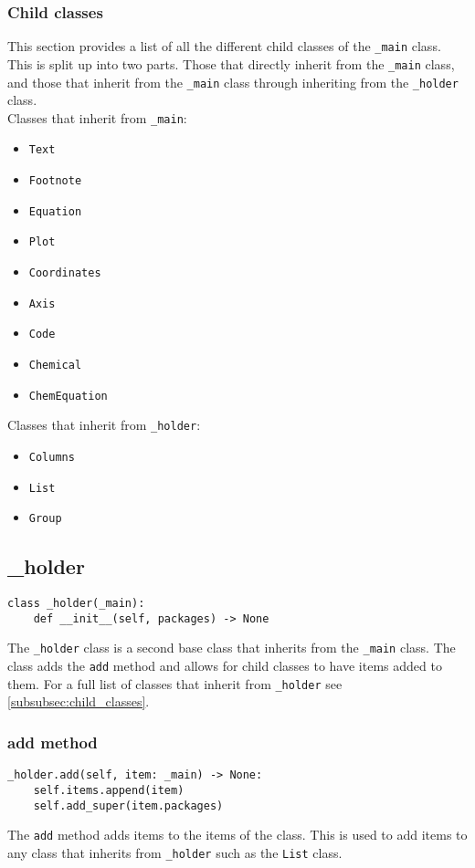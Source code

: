\documentclass{article}
\begin{document}
\subsubsection{Child classes}\label{subsubsec:child_classes}
This section provides a list of all the different child classes of the \verb|_main| class. This is split up into two parts. Those that directly inherit from the \verb|_main| class, and those that inherit from the \verb|_main| class through inheriting from the \verb|_holder| class.\\
Classes that inherit from \verb|_main|:\begin{multicols}{2}\begin{itemize}
\item \verb|Text|
\item \verb|Footnote|
\item \verb|Equation|
\item \verb|Plot|
\item \verb|Coordinates|
\item \verb|Axis|
\item \verb|Code|
\item \verb|Chemical|
\item \verb|ChemEquation|
\end{itemize}
\end{multicols}Classes that inherit from \verb|_holder|:\begin{multicols}{2}\begin{itemize}
\item \verb|Columns|
\item \verb|List|
\item \verb|Group|
\end{itemize}
\end{multicols}
\subsection{\_holder}\label{subsec:_holder}
\begin{verbatim}
class _holder(_main):
	def __init__(self, packages) -> None
\end{verbatim}
The \verb|_holder| class is a second base class that inherits from the \verb|_main| class. The class adds the \verb|add| method and allows for child classes to have items added to them. For a full list of classes that inherit from \verb|_holder| see \autoref{subsubsec:child_classes}.
\subsubsection{add method}\label{subsubsec:add_method001}
\begin{verbatim}
_holder.add(self, item: _main) -> None:
	self.items.append(item)
	self.add_super(item.packages)
\end{verbatim}
The \verb|add| method adds items to the items of the class. This is used to add items to any class that inherits from \verb|_holder| such as the \verb|List| class.
\end{document}
